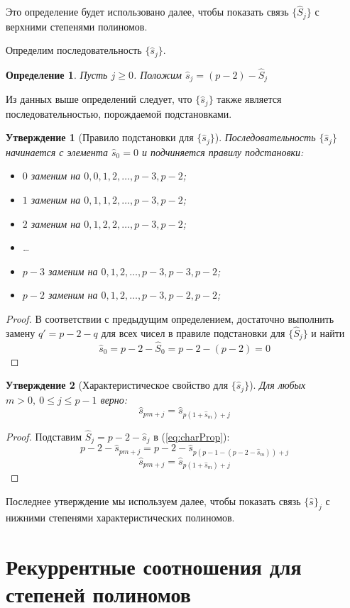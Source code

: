 \documentclass[14pt, a4paper, russian]{report}
\newtheorem{definition}{\indent Определение}
\newtheorem{proposition}{\indent Утверждение}
\begin{document}
Это определение будет использовано далее, чтобы показать связь $\{\hat{S}_j\}$ с верхними степенями полиномов.

Определим последовательность $\{\hat{s}_j\}$.
\begin{definition}
Пусть $j \ge 0$. Положим $\hat{s}_j = (p-2)-\hat{S}_j$
\end{definition}

Из данных выше определений следует, что $\{\hat{s}_j\}$ также является последовательностью, порождаемой подстановками.

\begin{proposition}[Правило подстановки для $\{\hat{s}_j\}$]
Последовательность $\{\hat{s}_j\}$ начинается с элемента $\hat{s}_0=0$ и подчиняется правилу подстановки:
\begin{itemize}
 \item $0$ заменим на $0, 0, 1, 2, \ldots, p-3, p-2$;
 \item $1$ заменим на $0, 1, 1, 2, \ldots, p-3, p-2$;
 \item $2$ заменим на $0, 1, 2, 2, \ldots, p-3, p-2$;
 \item \ldots
 \item $p-3$ заменим на $0, 1, 2, \ldots, p-3, p-3, p-2$;
 \item $p-2$ заменим на $0, 1, 2, \ldots, p-3, p-2, p-2$;
 \end{itemize}
\end{proposition}
\begin{proof}
В соответствии с предыдущим определением, достаточно выполнить замену $q' = p-2-q$ для всех чисел в правиле подстановки для $\{\hat{S}_j\}$ и найти $$\hat{s}_0 = p-2-\hat{S}_0 = p-2 - (p-2) = 0$$
\end{proof}

\begin{proposition}[Характеристическое свойство для $\{\hat{s}_j\}$]
Для любых $m > 0,\ 0 \le j \le p-1$ верно: $$\hat{s}_{pm+j}=\hat{s}_{p(1+\hat{s}_m) + j}$$
\end{proposition}
\begin{proof}
Подставим $\hat{S}_j = p-2-\hat{s}_j$ в (\ref{eq:charProp}):
$$p-2-\hat{s}_{pm+j}=p-2-\hat{s}_{p(p-1-(p-2-\hat{s}_m)) + j}$$
$$\hat{s}_{pm+j} = \hat{s}_{p(1+\hat{s}_m)+j}$$
\end{proof}

Последнее утверждение мы используем далее, чтобы показать связь $\{\hat{s}\}_j$ с нижними степенями характеристических полиномов.

\section{Рекуррентные соотношения для степеней полиномов}
\end{document}
